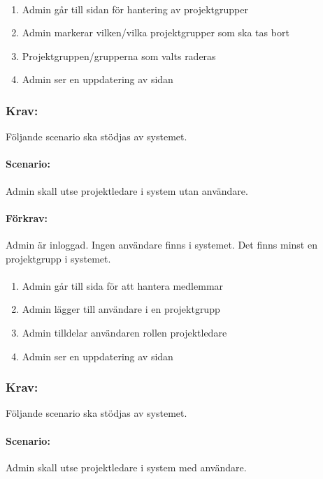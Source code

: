 \documentclass[paper=a4, fontsize=11pt,twoside]{article}
\begin{document}
	\paragraph{}
	\begin{enumerate}
		\item Admin går till sidan för hantering av projektgrupper
		\item Admin markerar vilken/vilka projektgrupper som ska tas bort
		\item Projektgruppen/grupperna som valts raderas
		\item Admin ser en uppdatering av sidan
	\end{enumerate}
	
	\subsubsection{Krav:} Följande scenario ska stödjas av systemet. 
	\paragraph{Scenario:}
	Admin skall utse projektledare i system utan användare.
	\paragraph{Förkrav:}
	Admin är inloggad. Ingen användare finns i systemet. Det finns minst en projektgrupp i systemet.
	\paragraph{}
	\begin{enumerate}
		\item Admin går till sida för att hantera medlemmar
		\item Admin lägger till användare i en projektgrupp
		\item Admin tilldelar användaren rollen projektledare
		\item Admin ser en uppdatering av sidan
	\end{enumerate}
	
	\subsubsection{Krav:} Följande scenario ska stödjas av systemet. 
	\paragraph{Scenario:}
	Admin skall utse projektledare i system med användare.
\end{document}
